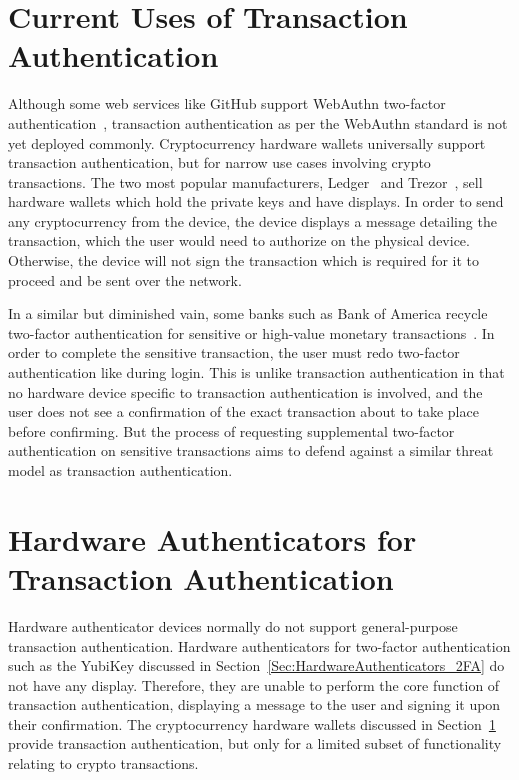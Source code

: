 \section{Current Uses of Transaction Authentication}\label{Sec:CurrentUses_txAuthn}


Although some web services like GitHub support WebAuthn two-factor authentication~\cite{webauthn-in-github}, transaction authentication as per the WebAuthn standard is not yet deployed commonly. Cryptocurrency hardware wallets universally support transaction authentication, but for narrow use cases involving crypto transactions. The two most popular manufacturers, Ledger~\cite{ledger} and Trezor~\cite{trezor}, sell hardware wallets which hold the private keys and have displays. In order to send any cryptocurrency from the device, the device displays a message detailing the transaction, which the user would need to authorize on the physical device. Otherwise, the device will not sign the transaction which is required for it to proceed and be sent over the network.

In a similar but diminished vain, some banks such as Bank of America recycle two-factor authentication for sensitive or high-value monetary transactions~\cite{BoA-2FA}. In order to complete the sensitive transaction, the user must redo two-factor authentication like during login. This is unlike transaction authentication in that no hardware device specific to transaction authentication is involved, and the user does not see a confirmation of the exact transaction about to take place before confirming. But the process of requesting supplemental two-factor authentication on sensitive transactions aims to defend against a similar threat model as transaction authentication.

\section{Hardware Authenticators for \newline Transaction Authentication}

Hardware authenticator devices normally do not support general-purpose transaction authentication. Hardware authenticators for two-factor authentication such as the YubiKey discussed in Section~\ref{Sec:HardwareAuthenticators_2FA} do not have any display. Therefore, they are unable to perform the core function of transaction authentication, displaying a message to the user and signing it upon their confirmation. The cryptocurrency hardware wallets discussed in Section~\ref{Sec:CurrentUses_txAuthn} provide transaction authentication, but only for a limited subset of functionality relating to crypto transactions.  

